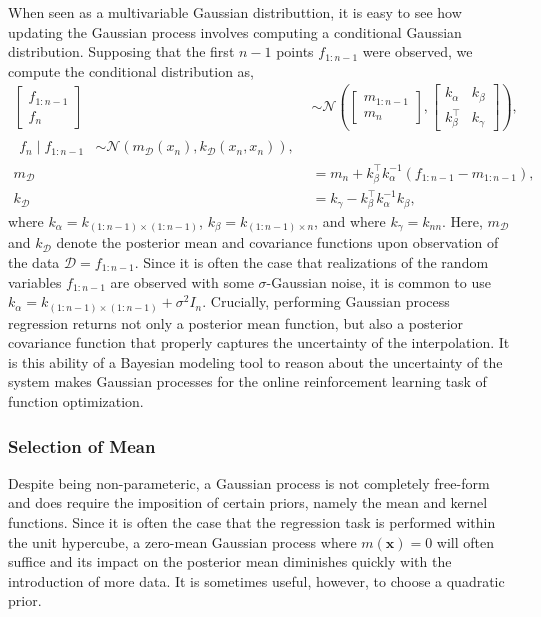 \documentclass{article}
\newcommand{\x}{\mathbf{x}}
\newcommand{\D}{\mathcal{D}}
\newcommand{\N}[1]{\mathcal{N}\left(#1\right)}
\begin{document}
When seen as a multivariable Gaussian distributtion, it is easy to see how updating the Gaussian process involves computing a conditional Gaussian distribution. Supposing that the first $n-1$ points $f_{1:n-1}$ were observed, we compute the conditional distribution as,
\begin{align}
  \begin{bmatrix}
    f_{1:n-1} \\ f_n
  \end{bmatrix} &\sim
  \N{
    \begin{bmatrix} m_{1:n-1} \\  m_n \end{bmatrix},
    \begin{bmatrix}
      k_\alpha  & k_\beta \\
      k_\beta^\top  & k_\gamma
    \end{bmatrix}
  }, \\
  \begin{split}
    f_n \mid f_{1:n-1} &\sim
  \mathcal{N} (m_\D(x_n), k_\D(x_n, x_n)),
  \end{split}\\
  m_\D &= m_n + k_\beta^\top k_\alpha^{-1}(f_{1:n-1} - m_{1:n-1}), \\
  k_\D &= k_\gamma - k_\beta^\top k_\alpha^{-1} k_\beta,
\end{align}
where $k_\alpha = k_{(1:n-1) \times (1:n-1)}$, $k_\beta = k_{(1:n-1) \times n}$, and where $k_\gamma = k_{nn}$. Here, $m_\D$ and $k_\D$ denote the posterior mean and covariance functions upon observation of the data $\D = f_{1:n-1}$. Since it is often the case that realizations of the random variables $f_{1:n-1}$ are observed with some $\sigma$-Gaussian noise, it is common to use $k_\alpha = k_{(1:n-1) \times (1:n-1)} + \sigma^2I_n$. Crucially, performing Gaussian process regression returns not only a posterior mean function, but also a posterior covariance function that properly captures the uncertainty of the interpolation. It is this ability of a Bayesian modeling tool to reason about the uncertainty of the system makes Gaussian processes for the online reinforcement learning task of function optimization.

\subsubsection{Selection of Mean}
Despite being non-parameteric, a Gaussian process is not completely free-form and does require the imposition of certain priors, namely the mean and kernel functions. Since it is often the case that the regression task is performed within the unit hypercube, a zero-mean Gaussian process where $m(\x) = 0$ will often suffice and its impact on the posterior mean diminishes quickly with the introduction of more data. It is sometimes useful, however, to choose a quadratic prior.
\end{document}
